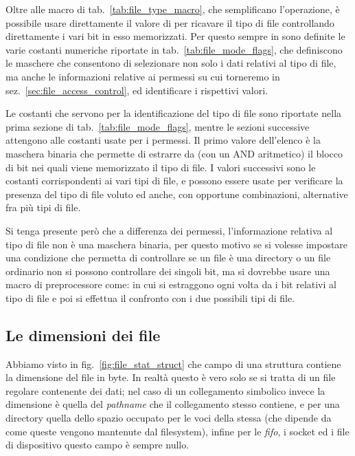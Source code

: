 Oltre alle macro di tab.~\ref{tab:file_type_macro}, che semplificano
l'operazione, è possibile usare direttamente il valore di  per
ricavare il tipo di file controllando direttamente i vari bit in esso
memorizzati. Per questo sempre in  sono definite le varie
costanti numeriche riportate in tab.~\ref{tab:file_mode_flags}, che
definiscono le maschere che consentono di selezionare non solo i dati relativi
al tipo di file, ma anche le informazioni relative ai permessi su cui
torneremo in sez.~\ref{sec:file_access_control}, ed identificare i rispettivi
valori.

Le costanti che servono per la identificazione del tipo di file sono riportate
nella prima sezione di tab.~\ref{tab:file_mode_flags}, mentre le sezioni
successive attengono alle costanti usate per i permessi.  Il primo valore
dell'elenco è la maschera binaria  che permette di estrarre da
 (con un AND aritmetico) il blocco di bit nei quali viene
memorizzato il tipo di file. I valori successivi sono le costanti
corrispondenti ai vari tipi di file, e possono essere usate per verificare la
presenza del tipo di file voluto ed anche, con opportune combinazioni,
alternative fra più tipi di file. 

Si tenga presente però che a differenza dei permessi, l'informazione relativa
al tipo di file non è una maschera binaria, per questo motivo se si volesse
impostare una condizione che permetta di controllare se un file è una
directory o un file ordinario non si possono controllare dei singoli bit, ma
si dovrebbe usare una macro di preprocessore come:
in cui si estraggono ogni volta da  i bit relativi al tipo di
file e poi si effettua il confronto con i due possibili tipi di file.


\subsection{Le dimensioni dei file}
\label{sec:file_file_size}

Abbiamo visto in fig.~\ref{fig:file_stat_struct} che campo  di
una struttura  contiene la dimensione del file in byte. In realtà
questo è vero solo se si tratta di un file regolare contenente dei dati; nel
caso di un collegamento simbolico invece la dimensione è quella del
\textit{pathname} che il collegamento stesso contiene, e per una directory
quella dello spazio occupato per le voci della stessa (che dipende da come
queste vengono mantenute dal filesystem), infine per le \textit{fifo}, i socket
ed i file di dispositivo questo campo è sempre nullo.

